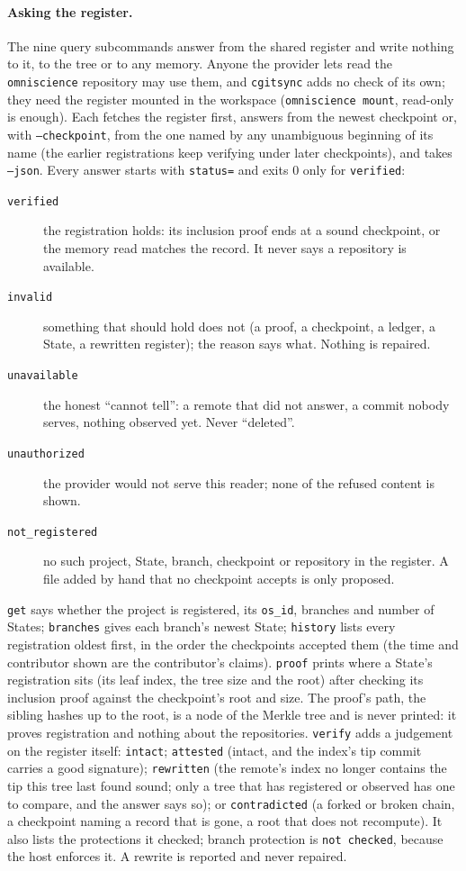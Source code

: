 \paragraph{Asking the register.} The nine query subcommands answer from the
shared register and write nothing to it, to the tree or to any memory. Anyone the
provider lets read the \texttt{omniscience} repository may use them, and
\texttt{cgitsync} adds no check of its own; they need the register mounted in the
workspace (\texttt{omniscience mount}, read-only is enough). Each fetches the
register first, answers from the newest checkpoint or, with \texttt{--checkpoint},
from the one named by any unambiguous beginning of its name (the earlier
registrations keep verifying under later checkpoints), and takes \texttt{--json}.
Every answer starts with \texttt{status=} and exits 0 only for \texttt{verified}:

\begin{description}
\item[\texttt{verified}] the registration holds: its inclusion proof ends at a sound
  checkpoint, or the memory read matches the record. It never says a repository is available.
\item[\texttt{invalid}] something that should hold does not (a proof, a checkpoint, a ledger,
  a State, a rewritten register); the reason says what. Nothing is repaired.
\item[\texttt{unavailable}] the honest ``cannot tell'': a remote that did not answer, a commit
  nobody serves, nothing observed yet. Never ``deleted''.
\item[\texttt{unauthorized}] the provider would not serve this reader; none of the refused
  content is shown.
\item[\texttt{not\_registered}] no such project, State, branch, checkpoint or repository in the
  register. A file added by hand that no checkpoint accepts is only proposed.
\end{description}

\texttt{get} says whether the project is registered, its \texttt{os\_id}, branches and
number of States; \texttt{branches} gives each branch's newest State; \texttt{history}
lists every registration oldest first, in the order the checkpoints accepted them
(the time and contributor shown are the contributor's claims). \texttt{proof} prints
where a State's registration sits (its leaf index, the tree size and the
root) after checking its inclusion proof against the checkpoint's root and size. The proof's
path, the sibling hashes up to the root, is a node of the Merkle tree and is never printed: it proves
registration and nothing about the repositories. \texttt{verify} adds a judgement on
the register itself: \texttt{intact}; \texttt{attested} (intact, and the index's tip
commit carries a good signature); \texttt{rewritten} (the remote's index no longer
contains the tip this tree last found sound; only a tree that has registered or
observed has one to compare, and the answer says so); or \texttt{contradicted} (a
forked or broken chain, a checkpoint naming a record that is gone, a root that does
not recompute). It also lists the protections it checked; branch protection is
\texttt{not checked}, because the host enforces it. A rewrite is reported and never repaired.

